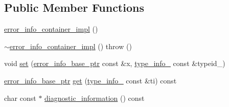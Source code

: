 \subsection*{Public Member Functions}
\begin{DoxyCompactItemize}
\item 
\hyperlink{classecto_1_1except_1_1error__info__container__impl_a258f844c2a2ee441c4e397971466f2c5}{error\+\_\+info\+\_\+container\+\_\+impl} ()
\item 
\hyperlink{classecto_1_1except_1_1error__info__container__impl_ab9391a11b1c7955810c184c07aec4858}{$\sim$error\+\_\+info\+\_\+container\+\_\+impl} ()  throw ()
\item 
void \hyperlink{classecto_1_1except_1_1error__info__container__impl_ac3931483b05bd3240a8ffe11c4977b99}{set} (\hyperlink{classecto_1_1except_1_1error__info__container__impl_a9fbca0758380cb123f790aee77d1d4d8}{error\+\_\+info\+\_\+base\+\_\+ptr} const \&x, \hyperlink{classecto_1_1except_1_1error__info__container__impl_abe4f51bf533842a5e0b81f3e43ae6267}{type\+\_\+info\+\_\+} const \&typeid\+\_\+)
\item 
\hyperlink{classecto_1_1except_1_1error__info__container__impl_a9fbca0758380cb123f790aee77d1d4d8}{error\+\_\+info\+\_\+base\+\_\+ptr} \hyperlink{classecto_1_1except_1_1error__info__container__impl_acab3219ea75b29048e2e4d8ad23028eb}{get} (\hyperlink{classecto_1_1except_1_1error__info__container__impl_abe4f51bf533842a5e0b81f3e43ae6267}{type\+\_\+info\+\_\+} const \&ti) const 
\item 
char const $\ast$ \hyperlink{classecto_1_1except_1_1error__info__container__impl_a9cd76f7d8bd75cdc5cf29061304a622a}{diagnostic\+\_\+information} () const 
\end{DoxyCompactItemize}
